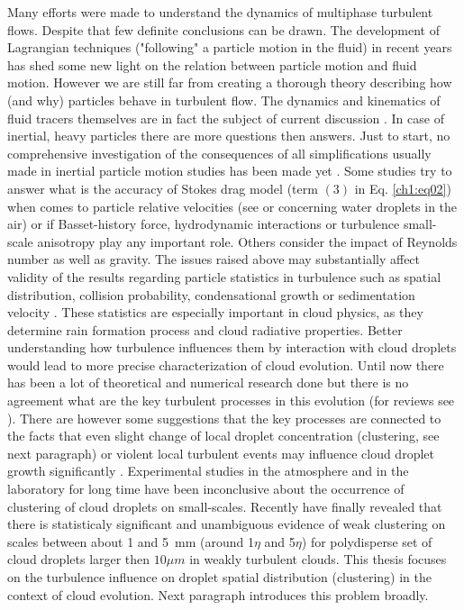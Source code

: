 \documentclass[../main.tex]{subfiles}
\begin{document}
Many efforts were made to understand the dynamics of multiphase turbulent flows. Despite that few definite conclusions can be drawn. The development of Lagrangian techniques ("following" a particle motion in the fluid) in recent years has shed some new light on the relation between particle motion and fluid motion. However we are still far from creating a thorough theory describing how (and why) particles behave in turbulent flow. The dynamics and kinematics of fluid tracers themselves are in fact the subject of current discussion \citep{Biferale2005,Arneodo2008, Toschi2009,Scatamacchia2012,Dhariwal2018}. In case of inertial, heavy particles there are more questions then answers. Just to start, no comprehensive investigation of the consequences of all simplifications usually made in inertial particle motion studies has been made yet \citep{Bourgoin2014}. Some studies try to answer what is the accuracy of Stokes drag model (term $(3)$ in Eq. \ref{ch1:eq02}) when comes to particle relative velocities (see \citet{Dou2018} or \citet{Saw2014} concerning water droplets in the air) or if Basset-history force,  hydrodynamic interactions or turbulence small-scale anisotropy play any important role. Others consider the impact of Reynolds number as well as gravity\citep{Ireland2016a, Ireland2016b}. The issues raised above may substantially affect validity of the results regarding particle statistics in turbulence such as spatial distribution, collision probability, condensational growth or sedimentation velocity \citep{Chen2018}. These statistics are especially important in cloud physics, as they determine rain formation process and cloud radiative properties. Better understanding how turbulence influences them by interaction with cloud droplets would lead to more precise characterization of cloud evolution\citep{Bodenschatz2010}. Until now there has been a lot of theoretical and numerical research done but there is no agreement what are the key turbulent processes in this evolution (for reviews see \citet{Vaillancourt2000, Shaw2003, Devenish2012, Grabowski2013, Pumir2016, Saito2018}). There are however some suggestions that the key processes are connected to the facts that even slight change of local droplet concentration (clustering, see next paragraph) or violent local turbulent events may influence cloud droplet growth significantly \citep{Kostinski2005, Bec2016, Madival2019}. Experimental studies in the atmosphere \citep{Chaumat2001, Pinsky2001, Kostinski2001, Shaw2002, Knyazikhin2005, Marshak2005, Lehmann2007, Glienke2017} and in the laboratory \citep{Jaczewski2005, Warhaft2008} for long time have been inconclusive about the occurrence of clustering of cloud droplets on small-scales. Recently \citet{Larsen2018} have finally revealed that there is statisticaly significant and unambiguous evidence of weak clustering on scales between about 1 and 5~mm (around 1$\eta$ and 5$\eta$) for polydisperse set of cloud droplets larger then $10\mu m$ in weakly turbulent clouds. This thesis focuses on the turbulence influence on droplet spatial distribution (clustering) in the context of cloud evolution. Next paragraph introduces this problem broadly.\\
\end{document}
